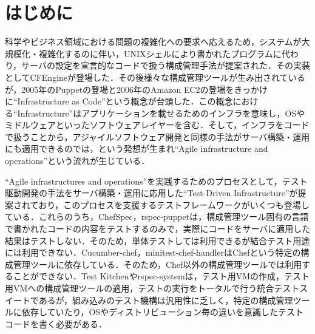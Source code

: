 \section{はじめに}

科学やビジネス領域における問題の複雑化への要求へ応えるため，システムが大規模化・複雑化する\cite{survey_and_taxonomy_of_iaas}のに伴い，UNIXシェルにより書かれたプログラムに代わり，サーバの設定を宣言的なコードで扱う構成管理手法が提案された．その実装としてCFEngine\cite{cfengine}が登場した．その後様々な構成管理ツールが生み出されているが\cite{cmt}，2005年のPuppetの登場\cite{puppet}と2006年のAmazon EC2の登場\cite{ec2}をきっかけに``Infrastructure as Code''という概念が台頭した．この概念における``Infrastructure''はアプリケーションを載せるためのインフラを意味し，OSやミドルウェアといったソフトウェアレイヤーを含む．そして，インフラをコードで扱うことから，アジャイルソフトウェア開発\cite{agile_manifesto}と同様の手法がサーバ構築・運用にも適用できるのでは，という発想が生まれ``Agile infrastructure and operations''\cite{agile_infrastructure}という流れが生じている．

``Agile infrastructures and operations''を実践するためのプロセスとして，テスト駆動開発\cite{test_driven_development}の手法をサーバ構築・運用に応用した``Test-Driven Infrastructure''\cite{test_driven_infrastructure_with_chef}が提案されており，このプロセスを支援するテストフレームワークがいくつも登場している\cite{chefspec}\cite{rspec-puppet}\cite{cucumber-chef}\cite{minitest-chef-handler}\cite{test-kitchen}\cite{rspec-system}．これらのうち，ChefSpec\cite{chefspec}，rspec-puppet\cite{rspec-puppet}は，構成管理ツール固有の言語で書かれたコードの内容をテストするのみで，実際にコードをサーバに適用した結果はテストしない．そのため，単体テストしては利用できるが結合テスト用途には利用できない．Cucumber-chef\cite{cucumber-chef}，minitest-chef-handler\cite{minitest-chef-handler}はChefという特定の構成管理ツールに依存している．そのため，Chef以外の構成管理ツールでは利用することができない．Test Kitchen\cite{test-kitchen}やrspec-system\cite{rspec-system}は，テスト用VMの作成，テスト用VMへの構成管理ツールの適用，テストの実行をトータルで行う統合テストスイートであるが，組み込みのテスト機構は汎用性に乏しく，特定の構成管理ツールに依存していたり，OSやディストリビューション毎の違いを意識したテストコードを書く必要がある．

